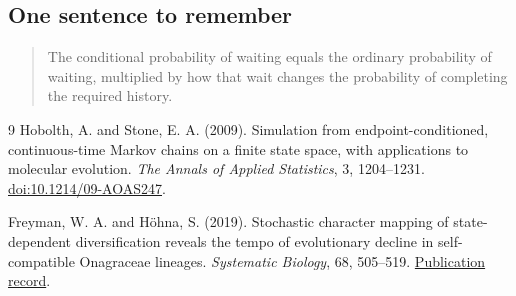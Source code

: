\documentclass[11pt,a4paper]{article}
\begin{document}
\subsection{One sentence to remember}
\begin{quote}
The conditional probability of waiting equals the ordinary probability of
waiting, multiplied by how that wait changes the probability of completing
the required history.
\end{quote}

\begin{thebibliography}{9}
Hobolth, A. and Stone, E. A. (2009).
Simulation from endpoint-conditioned, continuous-time Markov chains on a finite
state space, with applications to molecular evolution.
\emph{The Annals of Applied Statistics}, 3, 1204--1231.
\href{https://doi.org/10.1214/09-AOAS247}{doi:10.1214/09-AOAS247}.

Freyman, W. A. and H\"ohna, S. (2019).
Stochastic character mapping of state-dependent diversification reveals the
tempo of evolutionary decline in self-compatible Onagraceae lineages.
\emph{Systematic Biology}, 68, 505--519.
\href{https://pubmed.ncbi.nlm.nih.gov/30476308/}{Publication record}.
\end{thebibliography}
\end{document}

